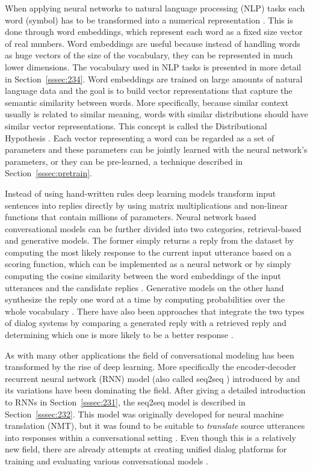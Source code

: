 \documentclass[12pt]{article}
\begin{document}
When applying neural networks to natural language processing (NLP) tasks each word (symbol) has to be transformed into a numerical representation \cite{Bengio:2003}. This is done through word embeddings, which represent each word as a fixed size vector of real numbers. Word embeddings are useful because instead of handling words as huge vectors of the size of the vocabulary, they can be represented in much lower dimensions. The vocabulary used in NLP tasks is presented in more detail in Section~\ref{sssec:234}. Word embeddings are trained on large amounts of natural language data and the goal is to build vector representations that capture the semantic similarity between words. More specifically, because similar context usually is related to similar meaning, words with similar distributions should have similar vector representations. This concept is called the Distributional Hypothesis \cite{Harris:1954}. Each vector representing a word can be regarded as a set of parameters and these parameters can be jointly learned with the neural network's parameters, or they can be pre-learned, a technique described in Section~\ref{sssec:pretrain}.

Instead of using hand-written rules deep learning models transform input sentences into replies directly by using matrix multiplications and non-linear functions that contain millions of parameters. Neural network based conversational models can be further divided into two categories, retrieval-based and generative models. The former simply returns a reply from the dataset by computing the most likely response to the current input utterance based on a scoring function, which can be implemented as a neural network \cite{Cho:2014} or by simply computing the cosine similarity between the word embeddings of the input utterances and the candidate replies \cite{stalemate:2016}. Generative models on the other hand synthesize the reply one word at a time by computing probabilities over the whole vocabulary \cite{Sutskever:2014,Vinyals:2015}. There have also been approaches that integrate the two types of dialog systems by comparing a generated reply with a retrieved reply and determining which one is more likely to be a better response \cite{Song:2016}.

As with many other applications the field of conversational modeling has been transformed by the rise of deep learning. More specifically the encoder-decoder recurrent neural network (RNN) model (also called seq2seq \cite{Sutskever:2014}) introduced by \cite{Cho:2014} and its variations have been dominating the field. After giving a detailed introduction to RNNs in Section~\ref{sssec:231}, the seq2seq model is described in Section~\ref{sssec:232}. This model was originally developed for neural machine translation (NMT), but it was found to be suitable to \textit{translate} source utterances into responses within a conversational setting \cite{Shang:2015,Vinyals:2015}. Even though this is a relatively new field, there are already attempts at creating unified dialog platforms for training and evaluating various conversational models \cite{Miller:2017}.
\end{document}
